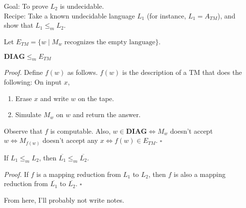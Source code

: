 \documentclass[a4paper]{article}
\newenvironment{proof}{\begin{breakbox}\textit{Proof.}}{\hfill$\square$\end{breakbox}}
\newcommand{\nl}{\vspace{0.2cm}\\}
\newcommand{\mf}{\mathbf}
\newcommand{\comp}{\overline}
\begin{document}
Goal: To prove $L_2$ is undecidable.\nl

Recipe: Take a known undecidable language $L_1$ (for instance, $L_1 = A_{TM}$), and show that $L_1 \le_m L_2$.\nl

\begin{eg}
    Let $E_{TM} = \{w \mid M_w \text{ recognizes the empty language}\}$.
\end{eg}

\begin{claim}
    $\mf{DIAG} \le_m E_{TM}$
\end{claim}

\begin{proof}
    Define $f(w)$ as follows. $f(w)$ is the description of a TM that does the following:
    On input $x$,
    \begin{enumerate}
        \item Erase $x$ and write $w$ on the tape.
        \item Simulate $M_w$ on $w$ and return the answer.
    \end{enumerate}
    Observe that $f$ is computable. Also, $w \in \mf{DIAG} \iff M_w$ doesn't accept $w \iff M_{f(w)}$ doesn't accept any $x \iff f(w) \in E_{TM}$.
\end{proof}

\begin{claim}
    If $L_1 \le_m L_2$, then $\comp{L_1} \le_m \comp{L_2}$.
\end{claim}

\begin{proof}
    If $f$ is a mapping reduction from $L_1$ to $L_2$, then $f$ is also a mapping reduction from $\comp{L_1}$ to $\comp{L_2}$.
\end{proof}

From here, I'll probably not write notes.
\end{document}
